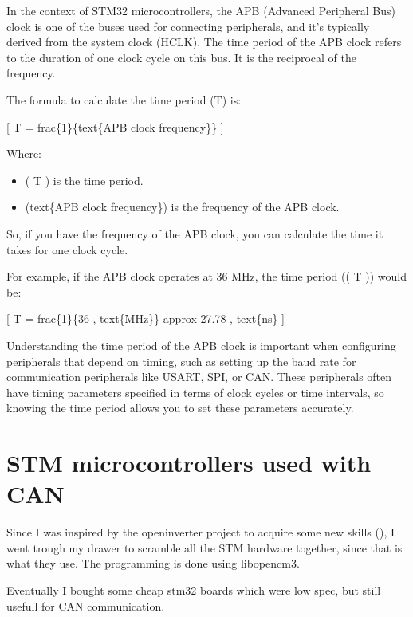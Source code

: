 \documentclass[letterpaper,10pt,english]{sphinxmanual}
\begin{document}
\sphinxAtStartPar
In the context of STM32 microcontrollers, the APB (Advanced Peripheral Bus) clock is one of the buses used for connecting peripherals, and it’s typically derived from the system clock (HCLK). The time period of the APB clock refers to the duration of one clock cycle on this bus. It is the reciprocal of the frequency.

\sphinxAtStartPar
The formula to calculate the time period (T) is:

\sphinxAtStartPar
{[} T = frac\{1\}\{text\{APB clock frequency\}\} {]}

\sphinxAtStartPar
Where:
\begin{itemize}
\item {} 
\sphinxAtStartPar
( T ) is the time period.

\item {} 
\sphinxAtStartPar
(text\{APB clock frequency\}) is the frequency of the APB clock.

\end{itemize}

\sphinxAtStartPar
So, if you have the frequency of the APB clock, you can calculate the time it takes for one clock cycle.

\sphinxAtStartPar
For example, if the APB clock operates at 36 MHz, the time period (( T )) would be:

\sphinxAtStartPar
{[} T = frac\{1\}\{36 , text\{MHz\}\} approx 27.78 , text\{ns\} {]}

\sphinxAtStartPar
Understanding the time period of the APB clock is important when configuring peripherals that depend on timing, such as setting up the baud rate for communication peripherals like USART, SPI, or CAN. These peripherals often have timing parameters specified in terms of clock cycles or time intervals, so knowing the time period allows you to set these parameters accurately.


\chapter{STM microcontrollers used with CAN}
\label{\detokenize{stm/index:stm-microcontrollers-used-with-can}}\label{\detokenize{stm/index::doc}}
\sphinxAtStartPar
Since I was inspired by the openinverter project to acquire some new skills (), I went trough my drawer to scramble all the STM hardware together, since that is what they use. The programming is done using libopencm3.

\sphinxAtStartPar
Eventually I bought some cheap stm32 boards which were low spec, but still usefull for CAN communication.
\end{document}
